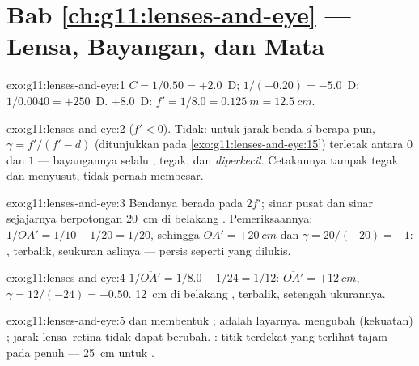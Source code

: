 \section*{Bab \ref{ch:g11:lenses-and-eye} --- Lensa, Bayangan, dan Mata}

\begin{solution}{exo:g11:lenses-and-eye:1}
$C = 1/0.50 = +2.0$~D; $1/(-0.20) = -5.0$~D; $1/0.0040 = +250$~D.
 $+8.0$~D: $f' = 1/8.0 = \qty{0.125}{m} = \qty{12.5}{cm}$.
\end{solution}

\begin{solution}{exo:g11:lenses-and-eye:2}
 ($f' < 0$). Tidak: untuk jarak benda $d$ berapa pun,
$\gamma = f'/(f' - d)$ (ditunjukkan pada
\cref{exo:g11:lenses-and-eye:15}) terletak antara $0$ dan $1$ ---
bayangannya selalu , tegak, dan \emph{diperkecil}. Cetakannya
tampak tegak dan menyusut, tidak pernah membesar.
\end{solution}

\begin{solution}{exo:g11:lenses-and-eye:3}
Bendanya berada pada $2f'$; sinar pusat dan sinar sejajarnya
berpotongan \qty{20}{cm} di belakang . Pemeriksaannya:
$1/\overline{OA'} = 1/10 - 1/20 = 1/20$, sehingga
$\overline{OA'} = +\qty{20}{cm}$ dan $\gamma = 20/(-20) = -1$: ,
terbalik, seukuran aslinya --- persis seperti yang dilukis.
\end{solution}

\begin{solution}{exo:g11:lenses-and-eye:4}
$1/\overline{OA'} = 1/8.0 - 1/24 = 1/12$:
$\overline{OA'} = +\qty{12}{cm}$, $\gamma = 12/(-24) = -0.50$.  \qty{12}{cm} di belakang , terbalik, setengah ukurannya.
\end{solution}

\begin{solution}{exo:g11:lenses-and-eye:5}
 dan  membentuk ;  adalah
layarnya.  mengubah  (kekuatan) ;
jarak lensa--retina tidak dapat berubah. : titik terdekat
yang terlihat tajam pada  penuh --- \qty{25}{cm} untuk .
\end{solution}

